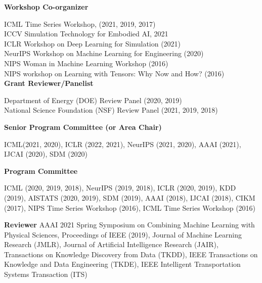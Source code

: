 \documentclass[margin,line]{res}
\begin{document}
\begin{resume}
{\bf Workshop Co-organizer}

ICML Time Series  Workshop, (2021, 2019, 2017) \\
ICCV Simulation Technology for Embodied AI, 2021\\
ICLR Workshop on Deep  Learning for Simulation (2021) \\
NeurIPS  Workshop on Machine Learning for Engineering (2020)\\
NIPS Woman in Machine Learning Workshop (2016) \\
NIPS workshop on Learning with Tensors: Why Now and How? (2016) \\




{\bf Grant Reviewer/Panelist}

 Department of Energy (DOE) Review Panel (2020, 2019) \\
National Science Foundation (NSF) Review Panel (2021, 2019, 2018)



{\bf Senior Program Committee (or Area Chair)}

 ICML(2021, 2020), ICLR (2022, 2021), NeurIPS (2021, 2020), AAAI (2021), IJCAI (2020), SDM (2020)

{\bf Program Committee}

ICML (2020, 2019, 2018), NeurIPS (2019, 2018), ICLR (2020, 2019), KDD (2019), AISTATS (2020, 2019), SDM (2019), AAAI (2018), IJCAI (2018), CIKM (2017), NIPS Time Series Workshop (2016), ICML Time Series Workshop (2016)


{\bf Reviewer}
AAAI 2021 Spring Symposium on Combining Machine Learning with Physical Sciences,
Proceedings of IEEE (2019), Journal of Machine Learning Research (JMLR), Journal of Artificial Intelligence Research (JAIR), Transactions on Knowledge Discovery from Data (TKDD), IEEE Transactions on Knowledge and Data Engineering (TKDE),  IEEE Intelligent Transportation Systems Transaction (ITS)




%



\end{resume}
\end{document}
